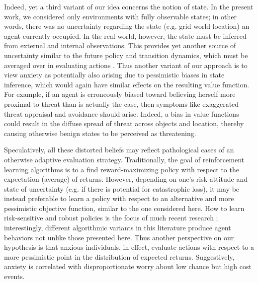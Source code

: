 \documentclass[11pt]{article} %
\begin{document}
Indeed, yet a third variant of our idea concerns the notion of state. In the present work, we considered only environments with fully observable states; in other words, there was no uncertainty regarding the state (e.g. grid world location) an agent currently occupied. In the real world, however, the state must be inferred from external and internal observations. This provides yet another source of uncertainty similar to the future policy and transition dynamics, which must be averaged over in evaluating actions \citep{kaelbling1998}. Thus another variant of our approach is to view anxiety as potentially also arising due to pessimistic biases in state inference\cite{Paulus2012}, which would again have similar effects on the resulting value function. For example, if an agent is erroneously biased toward believing herself more proximal to threat than is actually the case, then symptoms like exaggerated threat appraisal and avoidance should arise. Indeed, a bias in value functions could result in the diffuse spread of threat across objects\citep{norbury2018} and location\citep{schulz2018}, thereby causing otherwise benign states to be perceived as threatening. 

Speculatively, all these distorted beliefs may reflect pathological cases of an otherwise adaptive evaluation strategy. Traditionally, the goal of reinforcement learning algorithms is to a find reward-maximizing policy with respect to the expectation (average) of returns. However, depending on one's risk attitude and state of uncertainty (e.g. if there is potential for catastrophic loss), it may be instead preferable to learn a policy with respect to an alternative and more pessimistic objective function, similar to the one considered here. How to learn risk-sensitive and robust policies is the focus of much recent research \cite{morimura2012, chow2015, bellemare2017}; interestingly, different algorithmic variants in this literature produce agent behaviors not unlike those presented here. Thus another perspective on our hypothesis is that anxious individuals, in effect, evaluate actions with respect to a more pessimistic point in the distribution of expected returns.
Suggestively, anxiety is correlated with disproportionate worry about low chance but high cost events\cite{Miceli2005}. 
\end{document}
